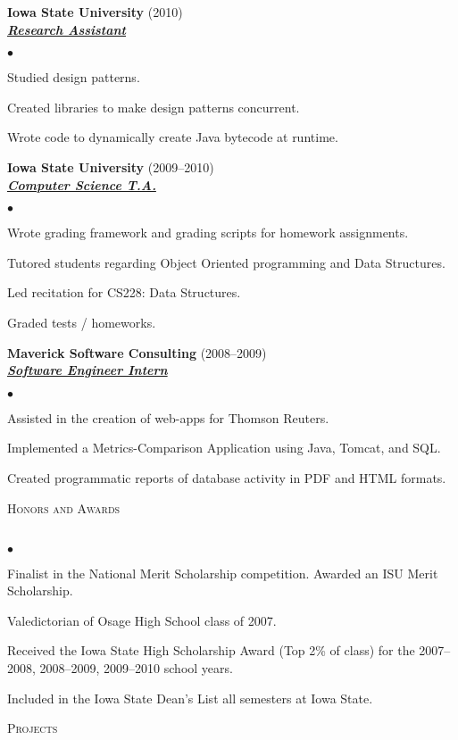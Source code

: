 \documentclass{article}
\newcommand{\lineunder} {
	\vspace*{-8pt} \\ \hspace*{-18pt} \hrulefill \\
}
\newcommand{\header}[1] {
	{\hspace*{-15pt}\vspace*{6pt} \textsc{#1}} \vspace*{-6pt} \lineunder
}
\newcommand{\employer}[3] {
	{ \textbf{#1} (#2)\\ \underline{\textbf{\emph{#3}}}\\  }
}
\newenvironment{achievements} {
	\begin{list}{$\bullet$}
		{\topsep 0pt \itemsep -2pt}
	}{
		\vspace*{4pt}\end{list}
	}
\begin{document}
	\employer{Iowa State University}{2010}{Research Assistant}
		\begin{achievements}
			\item{Studied design patterns.}
			\item{Created libraries to make design patterns concurrent.}
			\item{Wrote code to dynamically create Java bytecode at runtime.}
		\end{achievements}

	\employer{Iowa State University}{2009--2010}{Computer Science T.A.}
		\begin{achievements}
			\item{Wrote grading framework and grading scripts for homework assignments.}
			\item{Tutored students regarding Object Oriented programming and Data Structures.}
			\item{Led recitation for CS228: Data Structures.}
			\item{Graded tests / homeworks.}
		\end{achievements}

	\employer{Maverick Software Consulting}{2008--2009}{Software Engineer Intern}
		\begin{achievements}
			\item{Assisted in the creation of web-apps for Thomson Reuters.}
			\item{Implemented a Metrics-Comparison Application using Java, Tomcat, and SQL.}
			\item{Created programmatic reports of database activity in PDF and HTML formats.}
		\end{achievements}


\header{Honors and Awards}

	\begin{achievements}
		\item{Finalist in the National Merit Scholarship competition. Awarded an ISU Merit Scholarship.}
		\item{Valedictorian of Osage High School class of 2007.}
		\item{Received the Iowa State High Scholarship Award (Top 2\% of class) for the 2007--2008, 2008--2009, 2009--2010 school years.}
		\item{Included in the Iowa State Dean's List all semesters at Iowa State.}
	\end{achievements}

\header{Projects}
\end{document}
